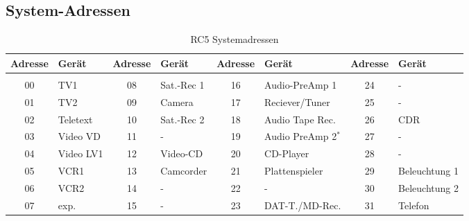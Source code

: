 \subsection{System-Adressen}

\begin{table}[h!]
    \footnotesize
    \centering
    \begin{tabular}{c l c l c l c l}
    Adresse & Gerät & Adresse & Gerät & Adresse & Gerät & Adresse & Gerät 
    \\
    \hline &&&&&&& \\
    00      & TV1       & 08 & Sat.-Rec 1   & 16 & Audio-PreAmp 1       & 24 & -                \\
    01      & TV2       & 09 & Camera       & 17 & Reciever/Tuner       & 25 & -                \\
    02      & Teletext  & 10 & Sat.-Rec 2   & 18 & Audio Tape Rec.      & 26 & CDR              \\
    03      & Video VD  & 11 & -            & 19 & Audio PreAmp 2$^*$   & 27 & -                \\
    04      & Video LV1 & 12 & Video-CD     & 20 & CD-Player            & 28 & -                \\
    05      & VCR1      & 13 & Camcorder    & 21 & Plattenspieler       & 29 & Beleuchtung 1    \\
    06      & VCR2      & 14 & -            & 22 & -                    & 30 & Beleuchtung 2    \\
    07      & exp.      & 15 & -            & 23 & DAT-T./MD-Rec.       & 31 & Telefon          \\
    \end{tabular}
    \caption{RC5 Systemadressen}
    \label{tab:rc5_systemadressen}
\end{table}
